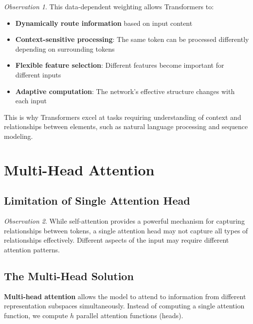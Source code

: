 \documentclass[11pt,a4paper]{article}
\theoremstyle{definition}
\theoremstyle{plain}
\theoremstyle{remark}
\newtheorem*{observation}{Observation}
\begin{document}
\begin{observation}
This data-dependent weighting allows Transformers to:
\begin{itemize}
    \item \textbf{Dynamically route information} based on input content
    \item \textbf{Context-sensitive processing}: The same token can be processed differently depending on surrounding tokens
    \item \textbf{Flexible feature selection}: Different features become important for different inputs
    \item \textbf{Adaptive computation}: The network's effective structure changes with each input
\end{itemize}

This is why Transformers excel at tasks requiring understanding of context and relationships between elements, such as natural language processing and sequence modeling.
\end{observation}

\section{Multi-Head Attention}

\subsection{Limitation of Single Attention Head}

\begin{observation}
While self-attention provides a powerful mechanism for capturing relationships between tokens, a single attention head may not capture all types of relationships effectively. Different aspects of the input may require different attention patterns.
\end{observation}

\subsection{The Multi-Head Solution}

\begin{tcolorbox}[colback=green!10!white,colframe=green!75!black,title=\textbf{Multi-Head Attention}]
\textbf{Multi-head attention} allows the model to attend to information from different representation subspaces simultaneously. Instead of computing a single attention function, we compute $h$ parallel attention functions (heads).
\end{tcolorbox}
\end{document}
